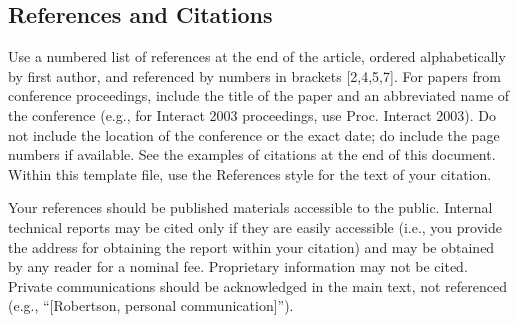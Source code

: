 \documentclass{chi2009}
\begin{document}
\subsection{References and Citations}

Use a numbered list of references at the end of the article, ordered
alphabetically by first author, and referenced by numbers in brackets
[2,4,5,7]. For papers from conference proceedings, include the title
of the paper and an abbreviated name of the conference (e.g., for
Interact 2003 proceedings, use Proc. Interact 2003). Do not include
the location of the conference or the exact date; do include the page
numbers if available. See the examples of citations at the end of this
document. Within this template file, use the References style for the
text of your citation.

Your references should be published materials accessible to the
public.  Internal technical reports may be cited only if they are
easily accessible (i.e., you provide the address for obtaining the
report within your citation) and may be obtained by any reader for a
nominal fee.  Proprietary information may not be cited. Private
communications should be acknowledged in the main text, not referenced
(e.g., ``[Robertson, personal communication]'').




\end{document}
